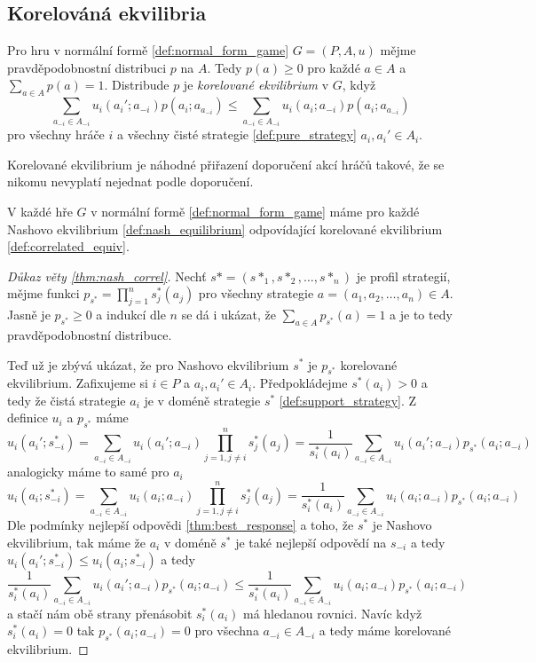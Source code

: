 \subsection{Korelováná ekvilibria}
\begin{definition}
\label{def:correlated_equiv}
Pro hru v normální formě \ref{def:normal_form_game} $G=(P,A,u)$ mějme pravděpodobnostní distribuci $p$ na $A$. 
Tedy $p(a) \geq 0$ pro každé $a \in A$ a $\sum_{a\in A} p(a) = 1$. 
Distribude $p$ je \textit{korelované ekvilibrium} v $G$, když 
$$ 
\sum_{a_{-i} \in A_{-i}} u_i(a_i'; a_{-i}) p(a_i; a_{a_{-i}}) \leq \sum_{a_{-i} \in A_{-i}} u_i(a_i; a_{-i}) p(a_i; a_{a_{-i}})  
$$
pro všechny hráče $i$ a všechny čisté strategie \ref{def:pure_strategy} $a_i, a_i' \in A_i$.
\end{definition}
Korelované ekvilibrium je náhodné přiřazení doporučení akcí hráčů takové, že se nikomu nevyplatí nejednat podle doporučení. 

\begin{theorem}
\label{thm:nash_correl}
    V každé hře $G$ v normální formě \ref{def:normal_form_game} máme pro každé Nashovo ekvilibrium \ref{def:nash_equilibrium} odpovídající korelované ekvilibrium \ref{def:correlated_equiv}. 
\end{theorem}
\begin{proof}[Důkaz věty \ref{thm:nash_correl}]
    Nechť $s* = (s*_1, s*_2, \dots, s*_n)$ je profil strategií, mějme funkci $p_{s^*} = \prod^n_{j=1} s_j^* (a_j)$ pro všechny strategie $a = (a_1, a_2, \dots, a_n) \in A$. 
    Jasně je $p_{s^*} \geq 0$ a indukcí dle $n$ se dá i ukázat, že $\sum_{a\in A} p_{s^*}(a) =1$ a je to tedy pravděpodobnostní distribuce. 

    Teď už je zbývá ukázat, že pro Nashovo ekvilibrium $s^*$ je $p_{s^*}$ korelované ekvilibrium. 
    Zafixujeme si $i \in P$ a $a_i, a_i' \in A_i$. Předpokládejme $s^*(a_i) > 0$ a tedy že čistá strategie $a_i$ je v doméně strategie $s^*$ \ref{def:support_strategy}. 
    Z definice $u_i$ a $p_{s^*}$ máme 
    $$ 
    u_i(a_i'; s^*_{-i}) = \sum_{a_{-i} \in A_{-i}} u_i(a_i'; a_{-i}) \prod_{j=1, j\neq i}^n s^*_j(a_j) = \frac{1}{s^*_i(a_i)} \sum_{a_{-i} \in A_{-i}} u_i(a_i'; a_{-i}) p_{s^*} (a_i; a_{-i})
    $$
    analogicky máme to samé pro $a_i$
    $$ 
    u_i(a_i; s^*_{-i}) = \sum_{a_{-i} \in A_{-i}} u_i(a_i; a_{-i}) \prod_{j=1, j\neq i}^n s^*_j(a_j) = \frac{1}{s^*_i(a_i)} \sum_{a_{-i} \in A_{-i}} u_i(a_i; a_{-i}) p_{s^*} (a_i; a_{-i})
    $$
    Dle podmínky nejlepší odpovědi \ref{thm:best_response} a toho, že $s^*$ je Nashovo ekvilibrium, tak máme že $a_i$ v doméně $s^*$ je také nejlepší odpovědí na $s_{-i}$ a tedy $u_i(a_i'; s^*_{-i}) \leq u_i(a_i; s^*_{-i})$ a tedy 
    $$ 
    \frac{1}{s^*_i(a_i)} \sum_{a_{-i} \in A_{-i}} u_i(a_i'; a_{-i}) p_{s^*} (a_i; a_{-i}) \leq \frac{1}{s^*_i(a_i)} \sum_{a_{-i} \in A_{-i}} u_i(a_i; a_{-i}) p_{s^*} (a_i; a_{-i})
    $$ 
    a stačí nám obě strany přenásobit $s^*_i(a_i)$ má hledanou rovnici. 
    Navíc když $s^*_i(a_i) = 0$ tak $p_{s^*}(a_i; a_{-i}) = 0$ pro všechna $a_{-i} \in A_{-i}$ a tedy máme korelované ekvilibrium.
\end{proof}

